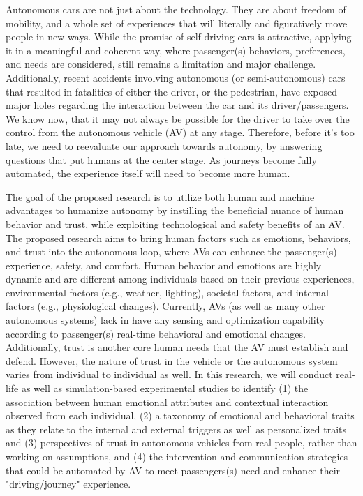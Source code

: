 
Autonomous cars are not just about the technology. They are about freedom of mobility, and a whole set of experiences that will literally and figuratively move people in new ways.
While the promise of self-driving cars is attractive, applying it in a meaningful and coherent way, where passenger(s) behaviors, preferences, and needs are considered, still remains a limitation and major challenge. Additionally, recent accidents involving autonomous (or semi-autonomous) cars that resulted in fatalities of either the driver, or the pedestrian, have exposed major holes regarding the interaction between the car and its driver/passengers. We know now, that it may not always be possible for the driver to take over the control from the autonomous vehicle (AV) at any stage. Therefore, before it’s too late, we need to reevaluate our approach towards autonomy, by answering questions that put humans at the center stage. As journeys become fully automated, the experience itself will need to become more human. 

The goal of the proposed research is to utilize both human and machine advantages to humanize autonomy by instilling the beneficial nuance of human behavior and trust, while exploiting technological and safety benefits of an AV. The proposed research aims to bring human factors such as emotions, behaviors, and trust into the autonomous loop, where AVs can enhance the passenger(s) experience, safety, and comfort. Human behavior and emotions are highly dynamic and are different among individuals based on their previous experiences, environmental factors (e.g., weather, lighting), societal factors, and internal factors (e.g., physiological changes). Currently, AVs (as well as many other autonomous systems) lack in have any sensing and optimization capability according to passenger(s) real-time behavioral and emotional changes. Additionally, trust is another core human needs that the AV must establish and defend. However, the nature of trust in the vehicle or the autonomous system varies from individual to individual as well. In this research, we will conduct real-life as well as simulation-based experimental studies to identify (1) the association between human emotional attributes and contextual interaction observed from each individual, (2) a taxonomy of emotional and behavioral traits as they relate to the internal and external triggers as well as personalized traits and (3) perspectives of trust in autonomous vehicles from real people, rather than working on assumptions, and (4) the intervention and communication strategies that could be automated by AV to meet passengers(s) need and enhance their "driving/journey" experience. 


